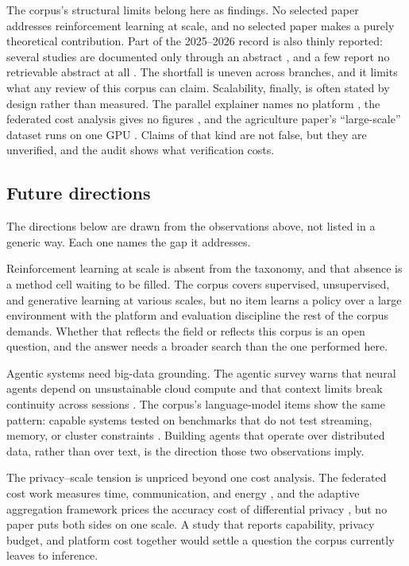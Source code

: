 \documentclass[pdflatex,sn-basic,Numbered]{sn-jnl}%
\begin{document}
The corpus's structural limits belong here as findings. No selected paper addresses reinforcement learning at scale, and no selected paper makes a purely theoretical contribution. Part of the 2025--2026 record is also thinly reported: several studies are documented only through an abstract \citep{xiao2025katn,gunbilek2026enhanced,jiang2026pexp,teixeira2025efficient,mohammadian2025explainable,chai2025graphllm,wang2026mllm}, and a few report no retrievable abstract at all \citep{ghodsi2026opinion,liu2026heterogeneous,li2026large}. The shortfall is uneven across branches, and it limits what any review of this corpus can claim. Scalability, finally, is often stated by design rather than measured. The parallel explainer names no platform \citep{jiang2026pexp}, the federated cost analysis gives no figures \citep{teixeira2025efficient}, and the agriculture paper's ``large-scale'' dataset runs on one GPU \citep{elfouly2025deep}. Claims of that kind are not false, but they are unverified, and the audit shows what verification costs.

\subsection{Future directions}\label{subsec27}

The directions below are drawn from the observations above, not listed in a generic way. Each one names the gap it addresses.

Reinforcement learning at scale is absent from the taxonomy, and that absence is a method cell waiting to be filled. The corpus covers supervised, unsupervised, and generative learning at various scales, but no item learns a policy over a large environment with the platform and evaluation discipline the rest of the corpus demands. Whether that reflects the field or reflects this corpus is an open question, and the answer needs a broader search than the one performed here.

Agentic systems need big-data grounding. The agentic survey warns that neural agents depend on unsustainable cloud compute and that context limits break continuity across sessions \citep{abouali2025agentic}. The corpus's language-model items show the same pattern: capable systems tested on benchmarks that do not test streaming, memory, or cluster constraints \citep{wang2026mllm,chai2025graphllm}. Building agents that operate over distributed data, rather than over text, is the direction those two observations imply.

The privacy--scale tension is unpriced beyond one cost analysis. The federated cost work measures time, communication, and energy \citep{teixeira2025efficient}, and the adaptive aggregation framework prices the accuracy cost of differential privacy \citep{haripriya2025privacy}, but no paper puts both sides on one scale. A study that reports capability, privacy budget, and platform cost together would settle a question the corpus currently leaves to inference.
\end{document}
